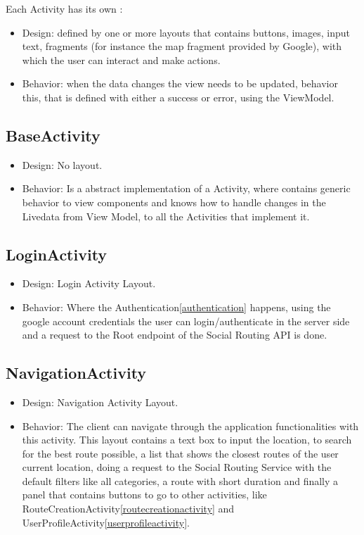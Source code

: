 Each Activity has its own :
\begin{itemize}
        \item Design: defined by one or more layouts that contains buttons, images, input text, fragments (for instance the map fragment provided by Google), 
        with which the user can interact and make actions.
        \item Behavior: when the data changes the view needs to be updated, behavior this, that is defined with either a success or error, using the ViewModel.
\end{itemize}

\subsection*{BaseActivity}
\begin{itemize}
        \item Design: No layout.
        \item Behavior: Is a abstract implementation of a Activity, where contains generic behavior to view components and knows how to handle changes in the Livedata from View Model, 
        to all the Activities that implement it.
\end{itemize}

\subsection*{LoginActivity}
\begin{itemize}
        \item Design: Login Activity Layout.\cite{loginactivitylayout}
        \item Behavior: Where the Authentication\ref{authentication} happens, using the google account credentials the user can login/authenticate in the server side and a
request to the Root endpoint of the Social Routing API is done.
\end{itemize}

\subsection*{NavigationActivity}
\begin{itemize}
        \item Design: Navigation Activity Layout.\cite{navigationactivitylayout}
        \item Behavior: The client can navigate through the application functionalities with this activity. This layout contains a text box to input the location, to search for the best 
route possible, a list that shows the closest routes of the user current location, doing a request to the Social Routing Service with the default filters like all categories,
a route with short duration and finally a panel that contains buttons to go to other activities, like RouteCreationActivity\ref{routecreationactivity} and 
UserProfileActivity\ref{userprofileactivity}.
\end{itemize}
\newpage

